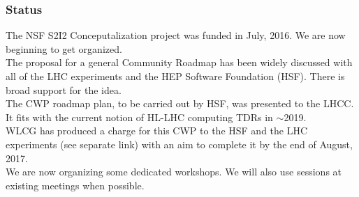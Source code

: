 \begin{frame}
\frametitle{Status}

\noindent 
The NSF S2I2 Conceputalization project was funded in July, 2016. We are now beginning to get organized. \\
\vskip 0.1in
The proposal for a general Community Roadmap has been widely discussed with all of the LHC experiments and the HEP Software Foundation (HSF). There is broad support for the idea. \\
\vskip 0.1in
The CWP roadmap plan, to be carried out by HSF, was presented to the LHCC. It fits with the current notion of HL-LHC computing TDRs in $\sim$2019.\\
\vskip 0.1in
WLCG has produced a charge for this CWP to the HSF and the LHC experiments (see separate link) with an aim to complete it by the end of August, 2017. \\
\vskip 0.1in
We are now organizing some dedicated workshops. We will also use sessions at existing meetings when possible. \\

\end{frame}


